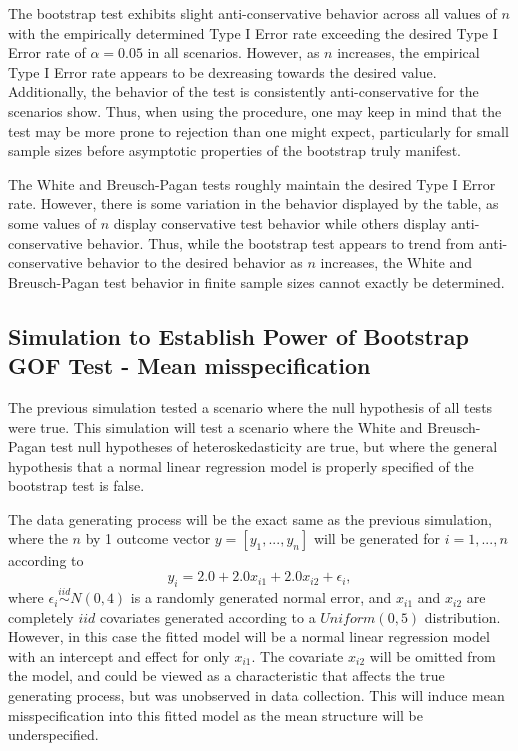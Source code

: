 		The bootstrap test exhibits slight anti-conservative behavior across all values of $n$ with the empirically determined Type I Error rate exceeding the desired Type I Error rate
		of $\alpha = 0.05$ in all scenarios. However, as $n$ increases, the empirical Type I Error rate appears to be dexreasing towards the desired value. Additionally, the
		behavior of the test is consistently anti-conservative for the scenarios show. Thus, when using the procedure, one may keep in mind that the test may be more prone to
		rejection than one might expect, particularly for small sample sizes before asymptotic properties of the bootstrap truly manifest.

		The White and Breusch-Pagan tests roughly maintain the desired Type I Error rate. However, there is some variation in the behavior displayed by the table, as some values
		of $n$ display conservative test behavior while others display anti-conservative behavior. Thus, while the bootstrap test appears to trend from anti-conservative behavior
		to the desired behavior as $n$ increases, the White and Breusch-Pagan test behavior in finite sample sizes cannot exactly be determined.

		\subsection{Simulation to Establish Power of Bootstrap GOF Test - Mean misspecification}

		The previous simulation tested a scenario where the null hypothesis of all tests were true. This simulation will test a scenario where the White and
		Breusch-Pagan test null hypotheses of heteroskedasticity are true, but where the general hypothesis that a normal linear regression model is properly
		specified of the bootstrap test is false.

		The data generating process will be the exact same as the previous simulation, where the $n$ by 1 outcome vector $y = [y_1,...,y_n]$ will be generated
		for $i = 1,...,n$ according to
		\begin{equation}
			y_i = 2.0 + 2.0 x_{i1} + 2.0 x_{i2} + \epsilon_i , 
		\end{equation}
		where $\epsilon_i \stackrel{iid}{\sim} N(0,4)$ is a randomly generated normal error, and $x_{i1}$ and $x_{i2}$ are completely $iid$ covariates generated according to
		a $Uniform(0,5)$ distribution. However, in this case the fitted model will be a normal linear regression model with an intercept and effect for only
		$x_{i1}$. The covariate $x_{i2}$ will be omitted from the model, and could be viewed as a characteristic that affects the true generating process, but
		was unobserved in data collection. This will induce mean misspecification into this fitted model as the mean structure will be underspecified.

